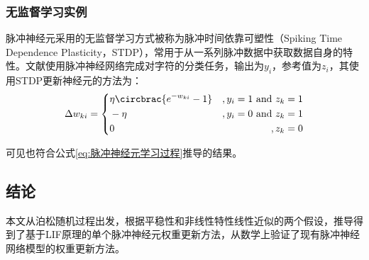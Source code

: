 \documentclass[11pt]{article}
\begin{document}
\subsubsection{无监督学习实例}
脉冲神经元采用的无监督学习方式被称为脉冲时间依靠可塑性（Spiking Time Dependence Plasticity，STDP），常用于从一系列脉冲数据中获取数据自身的特性。文献\cite{nesslerSTDPEnablesSpiking2009}使用脉冲神经网络完成对字符的分类任务，输出为$y_i$，参考值为$z_i$，其使用STDP更新神经元的方法为：
\begin{align}
  \Delta w_{ki}=\left\{\begin{aligned}
                     & \eta\circbrac{e^{-w_{ki}}-1} & ,y_i=1\text{ and }z_k=1  \\
                     & -\eta & ,y_i=0\text{ and }z_k=1 \\
                     & 0        & ,z_k=0
                  \end{aligned}\right.
\end{align}\par
可见也符合公式\ref{eq:脉冲神经元学习过程}推导的结果。
\subsection{结论}
本文从泊松随机过程出发，根据平稳性和非线性特性线性近似的两个假设，推导得到了基于LIF原理的单个脉冲神经元权重更新方法，从数学上验证了现有脉冲神经网络模型的权重更新方法。\cite{PeiZhaoYuYueQiuTanCeJinZhanYuGuoJiYueQiuKeYanZhan2020}\cite{xinHighprecisionCoregistrationOrbiter2018}
\newpage
\printbibliography[heading=bibliography,title=参考文献]
\end{document}
